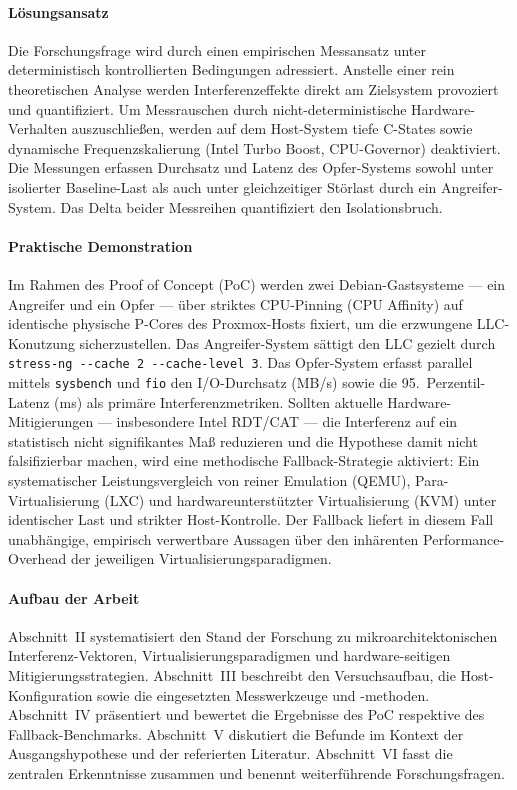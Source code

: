 \documentclass[conference]{IEEEtran}
\begin{document}
\paragraph{Lösungsansatz}
Die Forschungsfrage wird durch einen empirischen Messansatz unter
deterministisch kontrollierten Bedingungen adressiert. Anstelle einer
rein theoretischen Analyse werden Interferenzeffekte direkt am
Zielsystem provoziert und quantifiziert. Um Messrauschen durch
nicht-deterministische Hardware-Verhalten auszuschließen, werden auf dem
Host-System tiefe C-States sowie dynamische Frequenzskalierung (Intel
Turbo Boost, CPU-Governor) deaktiviert. Die Messungen erfassen Durchsatz
und Latenz des Opfer-Systems sowohl unter isolierter Baseline-Last als
auch unter gleichzeitiger Störlast durch ein Angreifer-System. Das Delta
beider Messreihen quantifiziert den Isolationsbruch.

\paragraph{Praktische Demonstration}
Im Rahmen des Proof of Concept (PoC) werden zwei Debian-Gastsysteme
--- ein Angreifer und ein Opfer --- über striktes CPU-Pinning
(CPU Affinity) auf identische physische P-Cores des Proxmox-Hosts
fixiert, um die erzwungene LLC-Konutzung sicherzustellen. Das
Angreifer-System sättigt den LLC gezielt durch
\texttt{stress-ng {-}{-}cache 2 {-}{-}cache-level 3}. Das
Opfer-System erfasst parallel mittels \texttt{sysbench} und \texttt{fio}
den I/O-Durchsatz (MB/s) sowie die 95.~Perzentil-Latenz (ms) als
primäre Interferenzmetriken. Sollten aktuelle Hardware-Mitigierungen
--- insbesondere Intel RDT/CAT --- die Interferenz auf ein statistisch
nicht signifikantes Maß reduzieren und die Hypothese damit nicht
falsifizierbar machen, wird eine methodische Fallback-Strategie
aktiviert: Ein systematischer Leistungsvergleich von reiner Emulation
(QEMU), Para-Virtualisierung (LXC) und hardwareunterstützter
Virtualisierung (KVM) unter identischer Last und strikter
Host-Kontrolle. Der Fallback liefert in diesem Fall unabhängige,
empirisch verwertbare Aussagen über den inhärenten Performance-Overhead
der jeweiligen Virtualisierungsparadigmen.

\paragraph{Aufbau der Arbeit}
Abschnitt~II systematisiert den Stand der Forschung zu
mikroarchitektonischen Interferenz-Vektoren, Virtualisierungsparadigmen
und hardware-seitigen Mitigierungsstrategien. Abschnitt~III beschreibt
den Versuchsaufbau, die Host-Konfiguration sowie die eingesetzten
Messwerkzeuge und -methoden. Abschnitt~IV präsentiert und bewertet die
Ergebnisse des PoC respektive des Fallback-Benchmarks. Abschnitt~V
diskutiert die Befunde im Kontext der Ausgangshypothese und der
referierten Literatur. Abschnitt~VI fasst die zentralen Erkenntnisse
zusammen und benennt weiterführende Forschungsfragen.
\end{document}
